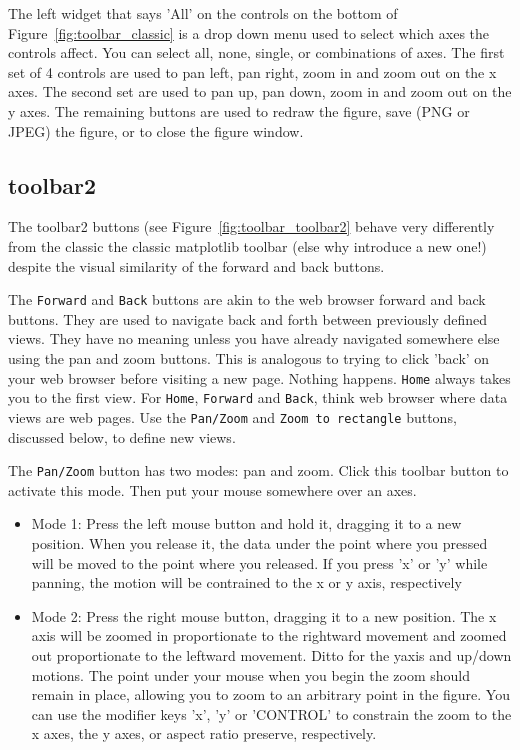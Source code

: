 \documentclass[twoside]{book}
\begin{document}
The left widget that says 'All' on the controls on the bottom of
Figure~\ref{fig:toolbar_classic} is a drop down menu used to select
which axes the controls affect.  You can select all, none, single, or
combinations of axes.  The first set of 4 controls are used to pan
left, pan right, zoom in and zoom out on the x axes.  The second set
are used to pan up, pan down, zoom in and zoom out on the y axes.  The
remaining buttons are used to redraw the figure, save (PNG or JPEG)
the figure, or to close the figure window.


\subsection{toolbar2}
\label{sec:toolbar_toolbar2}

The toolbar2 buttons (see Figure~\ref{fig:toolbar_toolbar2} behave
very differently from the classic the classic matplotlib toolbar (else
why introduce a new one!) despite the visual similarity of the forward
and back buttons.

The \texttt{Forward} and \texttt{Back} buttons are akin to the web browser
forward and back buttons.  They are used to navigate back and forth
between previously defined views.  They have no meaning unless you
have already navigated somewhere else using the pan and zoom buttons.
This is analogous to trying to click 'back' on your web browser before
visiting a new page.  Nothing happens.  \texttt{Home} always takes you to
the first view.  For \texttt{Home}, \texttt{Forward} and \texttt{Back}, think web
browser where data views are web pages.  Use the \texttt{Pan/Zoom} and
\texttt{Zoom to rectangle} buttons, discussed below, to define new views.

The \texttt{Pan/Zoom} button has two modes: pan and zoom.  Click this
toolbar button to activate this mode.  Then put your mouse somewhere
over an axes.

\begin{itemize}
\item Mode 1: Press the left mouse button and hold it, dragging it to
  a new position.  When you release it, the data under the point where
  you pressed will be moved to the point where you released.  If you
  press 'x' or 'y' while panning, the motion will be contrained to the
  x or y axis, respectively
  
\item Mode 2: Press the right mouse button, dragging it to a new
  position.  The x axis will be zoomed in proportionate to the
  rightward movement and zoomed out proportionate to the leftward
  movement.  Ditto for the yaxis and up/down motions.  The point under
  your mouse when you begin the zoom should remain in place, allowing
  you to zoom to an arbitrary point in the figure.  You can use the
  modifier keys 'x', 'y' or 'CONTROL' to constrain the zoom to the x
  axes, the y axes, or aspect ratio preserve, respectively.  

\end{itemize}
\end{document}
